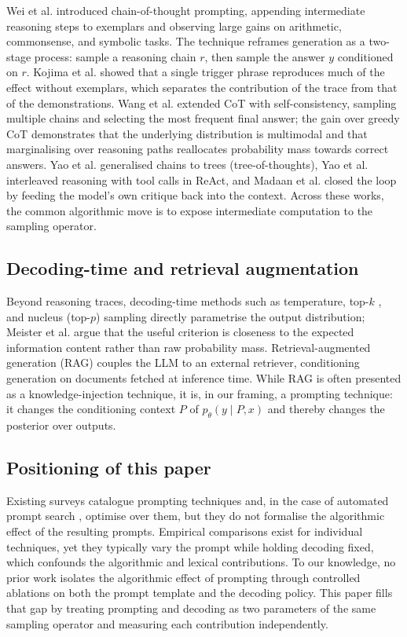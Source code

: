 \documentclass[conference]{IEEEtran}
\begin{document}
Wei et al. \cite{b3} introduced chain-of-thought prompting, appending intermediate reasoning steps to exemplars and observing large gains on arithmetic, commonsense, and symbolic tasks. The technique reframes generation as a two-stage process: sample a reasoning chain $r$, then sample the answer $y$ conditioned on $r$. Kojima et al. \cite{b9} showed that a single trigger phrase reproduces much of the effect without exemplars, which separates the contribution of the trace from that of the demonstrations. Wang et al. \cite{b4} extended CoT with self-consistency, sampling multiple chains and selecting the most frequent final answer; the gain over greedy CoT demonstrates that the underlying distribution is multimodal and that marginalising over reasoning paths reallocates probability mass towards correct answers. Yao et al. \cite{b5} generalised chains to trees (tree-of-thoughts), Yao et al. \cite{b6} interleaved reasoning with tool calls in ReAct, and Madaan et al. \cite{b12} closed the loop by feeding the model's own critique back into the context. Across these works, the common algorithmic move is to expose intermediate computation to the sampling operator.

\subsection{Decoding-time and retrieval augmentation}

Beyond reasoning traces, decoding-time methods such as temperature, top-$k$ \cite{b13}, and nucleus (top-$p$) sampling \cite{b8} directly parametrise the output distribution; Meister et al. \cite{b14} argue that the useful criterion is closeness to the expected information content rather than raw probability mass. Retrieval-augmented generation (RAG) \cite{b7} couples the LLM to an external retriever, conditioning generation on documents fetched at inference time. While RAG is often presented as a knowledge-injection technique, it is, in our framing, a prompting technique: it changes the conditioning context $P$ of $p_\theta(y \mid P, x)$ and thereby changes the posterior over outputs.

\subsection{Positioning of this paper}

Existing surveys \cite{b15,b16} catalogue prompting techniques and, in the case of automated prompt search \cite{b17}, optimise over them, but they do not formalise the algorithmic effect of the resulting prompts. Empirical comparisons exist for individual techniques, yet they typically vary the prompt while holding decoding fixed, which confounds the algorithmic and lexical contributions. To our knowledge, no prior work isolates the algorithmic effect of prompting through controlled ablations on both the prompt template and the decoding policy. This paper fills that gap by treating prompting and decoding as two parameters of the same sampling operator and measuring each contribution independently.
\end{document}
